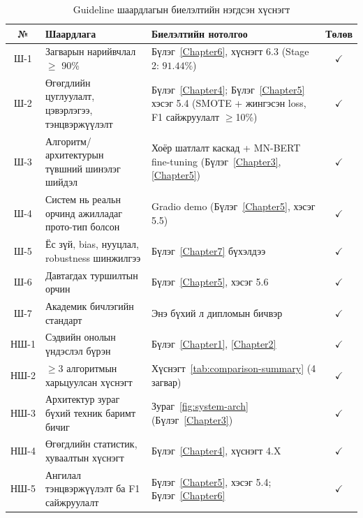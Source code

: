 \begin{table}[H]
\centering
\caption{Guideline шаардлагын биелэлтийн нэгдсэн хүснэгт}
\label{tab:requirements}
\begin{tabular}{@{}clp{7.5cm}c@{}}
\toprule
\textbf{№} & \textbf{Шаардлага} & \textbf{Биелэлтийн нотолгоо} & \textbf{Төлөв} \\
\midrule
Ш-1  & Загварын нарийвчлал $\geq$ 90\%            & Бүлэг~\ref{Chapter6}, хүснэгт 6.3 (Stage 2: $91.44\%$) & $\checkmark$ \\
Ш-2  & Өгөгдлийн цуглуулалт, цэвэрлэгээ, тэнцвэржүүлэлт    & Бүлэг~\ref{Chapter4}; Бүлэг~\ref{Chapter5} хэсэг 5.4 (SMOTE + жингэсэн loss, F1 сайжруулалт $\geq$10\%) & $\checkmark$ \\
Ш-3  & Алгоритм/архитектурын түвшний шинэлэг шийдэл   & Хоёр шатлалт каскад + MN-BERT fine-tuning (Бүлэг~\ref{Chapter3}, \ref{Chapter5}) & $\checkmark$ \\
Ш-4  & Систем нь реальн орчинд ажилладаг прото-тип болсон & Gradio demo (Бүлэг~\ref{Chapter5}, хэсэг 5.5) & $\checkmark$ \\
Ш-5  & Ёс зүй, bias, нууцлал, robustness шинжилгээ & Бүлэг~\ref{Chapter7} бүхэлдээ                        & $\checkmark$ \\
Ш-6  & Давтагдах туршилтын орчин                    & Бүлэг~\ref{Chapter5}, хэсэг 5.6                      & $\checkmark$ \\
Ш-7  & Академик бичлэгийн стандарт                  & Энэ бүхий л дипломын бичвэр                          & $\checkmark$ \\
\midrule
НШ-1 & Сэдвийн онолын үндэслэл бүрэн                & Бүлэг~\ref{Chapter1}, \ref{Chapter2}                 & $\checkmark$ \\
НШ-2 & $\geq\!3$ алгоритмын харьцуулсан хүснэгт     & Хүснэгт~\ref{tab:comparison-summary} (4 загвар)      & $\checkmark$ \\
НШ-3 & Архитектур зураг бүхий техник баримт бичиг   & Зураг~\ref{fig:system-arch} (Бүлэг~\ref{Chapter3})   & $\checkmark$ \\
НШ-4 & Өгөгдлийн статистик, хуваалтын хүснэгт       & Бүлэг~\ref{Chapter4}, хүснэгт 4.X                    & $\checkmark$ \\
НШ-5 & Ангилал тэнцвэржүүлэлт ба F1 сайжруулалт     & Бүлэг~\ref{Chapter5}, хэсэг 5.4; Бүлэг~\ref{Chapter6} & $\checkmark$ \\
\bottomrule
\end{tabular}
\end{table}

